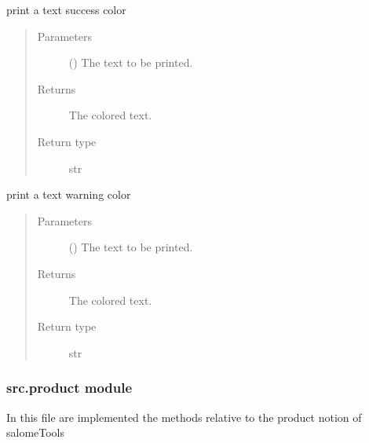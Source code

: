 \documentclass[a4paper,10pt,english]{sphinxmanual}
\begin{document}
\begin{fulllineitems}
\label{\detokenize{commands/apidoc/src:src.printcolors.printcSuccess}}
print a text success color
\begin{quote}\begin{description}
\item[{Parameters}] \leavevmode
{} () \textendash{} The text to be printed.

\item[{Returns}] \leavevmode
The colored text.

\item[{Return type}] \leavevmode
str

\end{description}\end{quote}

\end{fulllineitems}


\begin{fulllineitems}
\label{\detokenize{commands/apidoc/src:src.printcolors.printcWarning}}
print a text warning color
\begin{quote}\begin{description}
\item[{Parameters}] \leavevmode
{} () \textendash{} The text to be printed.

\item[{Returns}] \leavevmode
The colored text.

\item[{Return type}] \leavevmode
str

\end{description}\end{quote}

\end{fulllineitems}



\subsubsection{src.product module}
\label{\detokenize{commands/apidoc/src:module-src.product}}\label{\detokenize{commands/apidoc/src:src-product-module}}
In this file are implemented the methods 
relative to the product notion of salomeTools
\end{document}
